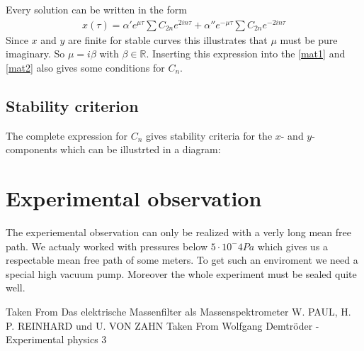 \documentclass[a4paper, parskip=half]{scrartcl}
\begin{document}
Every solution can be written in the form
\begin{align}
x(\tau) = \alpha'e^{\mu\tau} \sum C_{2n}e^{2in\tau} + \alpha''e^{-\mu\tau} \sum C_{2n}e^{-2in\tau}
\end{align}
Since $x$ and $y$ are finite for stable curves this illustrates that $\mu$ must be pure imaginary. So $\mu = i \beta$ with $\beta \in \mathbb{R}$.
Inserting this expression into the \eqref{mat1} and \eqref{mat2} also gives some conditions for $C_{n}$. 

\subsection{Stability criterion}
The complete expression for $C_n$ gives stability criteria for the $x$- and $y$-components which can be illustrted in a diagram: 


\section{Experimental observation}
The experiemental observation can only be realized with a verly long mean free path. We actualy worked with pressures below $5 \cdot 10^-4 Pa$ which gives us a respectable mean free path of some meters. To get such an enviroment we need a special high vacuum pump. Moreover the whole experiment must be sealed quite well.    
\begin{thebibliography}{999}
 Taken From Das elektrische Massenfilter als Massenspektrometer W. PAUL, H. P. REINHARD und U. VON ZAHN
 Taken From Wolfgang Demtröder - Experimental physics 3

\end{thebibliography}
\end{document}
